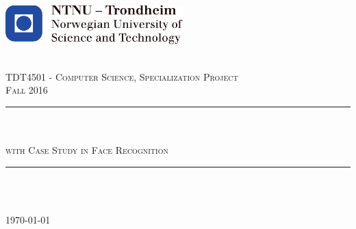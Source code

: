 \begin{titlepage}
\includegraphics[height=1.5cm]{images/ntnu_logo.pdf}\\[1cm]   
\begin{center}

 
~\\[1.5cm]

\textsc{\Large TDT4501 - Computer Science, Specialization Project}\\[0.5cm]
\textsc{\Large Fall 2016}\\[2.5cm]

\hrule ~\\[0.5cm]
{\huge \bfseries \mytitle}\\[0.4cm]		%
\textsc{\Large with Case Study in Face Recognition}\\[0.5cm]
\hrule ~\\[2.5cm]

\begin{minipage}{\textwidth}
    \centering
	\large
		\myauthor[0.5cm]
		\mysupervisor
\end{minipage}\\[0.5cm]




\vfill
{\large \today}

\end{center}
\end{titlepage}
